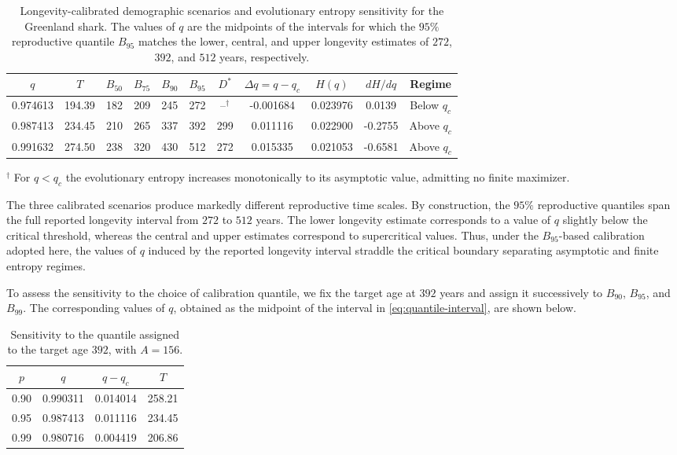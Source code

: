 \documentclass[11pt,a4paper]{amsart}
\begin{document}
\begin{table}[H]
\centering
\caption{Longevity-calibrated demographic scenarios and evolutionary
entropy sensitivity for the Greenland shark. The values of \(q\) are
the midpoints of the intervals for which the \(95\%\) reproductive
quantile \(B_{95}\) matches the lower, central, and upper longevity
estimates of \(272\), \(392\), and \(512\) years, respectively.}
\label{tab:calibrated-sensitivity}
\begin{tabular}{ccccccccccc}
\hline
\(q\)
& \(T\)
& \(B_{50}\)
& \(B_{75}\)
& \(B_{90}\)
& \(B_{95}\)
& \(D^{*}\)
& \(\Delta q=q-q_c\)
& \(H(q)\)
& \(dH/dq\)
& Regime
\\
\hline
0.974613
& 194.39
& 182
& 209
& 245
& 272
& --\(^{\dagger}\)
& -0.001684
& 0.023976
& 0.0139
& Below \(q_c\)
\\
0.987413
& 234.45
& 210
& 265
& 337
& 392
& 299
& 0.011116
& 0.022900
& -0.2755
& Above \(q_c\)
\\
0.991632
& 274.50
& 238
& 320
& 430
& 512
& 272
& 0.015335
& 0.021053
& -0.6581
& Above \(q_c\)
\\
\hline
\end{tabular}
\end{table}

{\footnotesize
$^\dagger$ 
For $q < q_c$ the  evolutionary entropy increases monotonically to its asymptotic value, admitting no finite maximizer.
}
\vspace{5pt}

The three calibrated scenarios produce markedly different reproductive
time scales. By construction, the \(95\%\) reproductive quantiles span the
full reported longevity interval from \(272\) to \(512\) years. The lower
longevity estimate corresponds to a value of \(q\) slightly below the
critical threshold, whereas the central and upper estimates correspond to
supercritical values. Thus, under the \(B_{95}\)-based calibration adopted here, the values of
\(q\) induced by the reported longevity interval straddle the critical
boundary separating asymptotic and finite entropy regimes.


To assess the sensitivity to the choice of calibration quantile, we fix the target age at \(392\) years and assign it successively
to \(B_{90}\), \(B_{95}\), and \(B_{99}\). The corresponding values of \(q\), obtained as the
midpoint of the interval in \eqref{eq:quantile-interval}, are shown
below.

\begin{table}[H]
\centering
\caption{Sensitivity to the quantile assigned to the target age
\(392\), with \(A=156\).}
\vspace{1mm}
\label{tab:quantile-sensitivity}
\begin{tabular}{cccc}
\hline
$p$ & $q$ & $q-q_c$ & $T$\\
\hline
0.90 & 0.990311 & 0.014014 & 258.21\\
0.95 & 0.987413 & 0.011116 & 234.45\\
0.99 & 0.980716 & 0.004419 & 206.86\\
\hline
\end{tabular}
\end{table}
\end{document}
